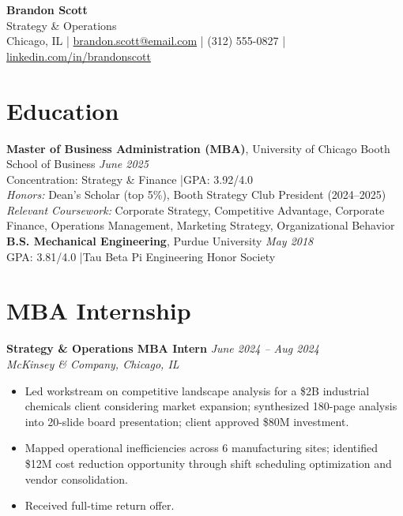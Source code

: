 \documentclass[11pt,a4paper]{article}
\begin{document}
\begin{center}
  {\LARGE \textbf{Brandon Scott}}\\[3pt]
  Strategy \& Operations\\[4pt]
  Chicago, IL \quad|\quad
  \href{mailto:brandon.scott@email.com}{brandon.scott@email.com} \quad|\quad
  (312) 555-0827 \quad|\quad
  \href{https://linkedin.com/in/brandonscott}{linkedin.com/in/brandonscott}
\end{center}

\section{Education}
\noindent\textbf{Master of Business Administration (MBA)}, University of Chicago Booth School of Business \hfill \textit{June 2025}\\
Concentration: Strategy \& Finance \quad|\quad GPA: 3.92/4.0\\
\textit{Honors:} Dean's Scholar (top 5\%), Booth Strategy Club President (2024--2025)\\
\textit{Relevant Coursework:} Corporate Strategy, Competitive Advantage, Corporate Finance, Operations Management, Marketing Strategy, Organizational Behavior\\[4pt]
\noindent\textbf{B.S. Mechanical Engineering}, Purdue University \hfill \textit{May 2018}\\
GPA: 3.81/4.0 \quad|\quad Tau Beta Pi Engineering Honor Society

\section{MBA Internship}

\noindent\textbf{Strategy \& Operations MBA Intern} \hfill \textit{June 2024 -- Aug 2024}\\
\textit{McKinsey \& Company, Chicago, IL}
\begin{itemize}
  \item Led workstream on competitive landscape analysis for a \$2B industrial chemicals client considering market expansion; synthesized 180-page analysis into 20-slide board presentation; client approved \$80M investment.
  \item Mapped operational inefficiencies across 6 manufacturing sites; identified \$12M cost reduction opportunity through shift scheduling optimization and vendor consolidation.
  \item Received full-time return offer.
\end{itemize}
\end{document}

